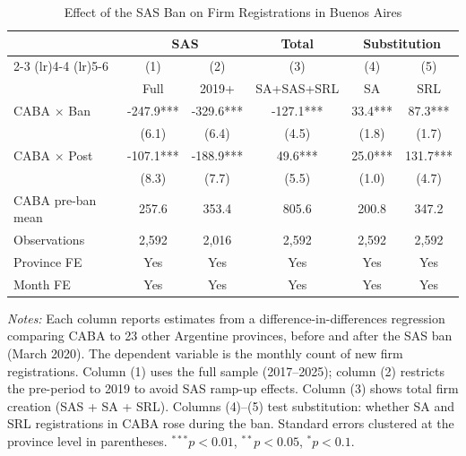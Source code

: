 \begin{table}[htbp]
\centering
\caption{Effect of the SAS Ban on Firm Registrations in Buenos Aires}
\label{tab:main}
\begin{tabular}{l*{5}{c}}
\toprule
 & \multicolumn{2}{c}{SAS} & Total & \multicolumn{2}{c}{Substitution} \\
\cmidrule(lr){2-3} \cmidrule(lr){4-4} \cmidrule(lr){5-6}
 & (1) & (2) & (3) & (4) & (5) \\
 & Full & 2019+ & SA+SAS+SRL & SA & SRL \\
\midrule
CABA $\times$ Ban & -247.9*** & -329.6*** & -127.1*** & 33.4*** & 87.3*** \\
 & (6.1) & (6.4) & (4.5) & (1.8) & (1.7) \\
\addlinespace
CABA $\times$ Post & -107.1*** & -188.9*** & 49.6*** & 25.0*** & 131.7*** \\
 & (8.3) & (7.7) & (5.5) & (1.0) & (4.7) \\
\midrule
CABA pre-ban mean & 257.6 & 353.4 & 805.6 & 200.8 & 347.2 \\
Observations & 2,592 & 2,016 & 2,592 & 2,592 & 2,592 \\
Province FE & Yes & Yes & Yes & Yes & Yes \\
Month FE & Yes & Yes & Yes & Yes & Yes \\
\bottomrule
\end{tabular}
\par\vspace{0.3em}\begin{minipage}{\textwidth}\footnotesize
\textit{Notes:} Each column reports estimates from a difference-in-differences regression comparing CABA to 23 other Argentine provinces, before and after the SAS ban (March 2020). The dependent variable is the monthly count of new firm registrations. Column (1) uses the full sample (2017--2025); column (2) restricts the pre-period to 2019 to avoid SAS ramp-up effects. Column (3) shows total firm creation (SAS + SA + SRL). Columns (4)--(5) test substitution: whether SA and SRL registrations in CABA rose during the ban. Standard errors clustered at the province level in parentheses. $^{***}p<0.01$, $^{**}p<0.05$, $^{*}p<0.1$.
\end{minipage}
\end{table}

